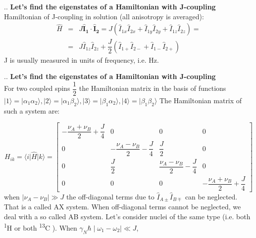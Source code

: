 \documentclass[handout]{beamer}
\begin{document}
\begin{frame}{\thesection.\thesubsection. \insertsubsection}
	\textbf{Let's find the eigenstates  of a Hamiltonian with J-coupling} \\
			Hamiltonian of J-coupling in solution (all anisotropy is averaged):
			\begin{equation}
			\begin{array}{lcl}
			\hat{H}  &=& J \bm{\hat{I}_{1}} \cdot  \bm{\hat{I}_{2}} = J ( \hat{I}_{1x} \hat{I}_{2x} + \hat{I}_{1y} \hat{I}_{2y} + \hat{I}_{1z} \hat{I}_{2z}   ) =	\\
			&=&  J  \hat{I}_{1z} \hat{I}_{2z} +\dfrac{J}{2} (\hat{I}_{1+} \hat{I}_{2-} + \hat{I}_{1-} \hat{I}_{2+} )  	  
			\end{array}
			\end{equation}
			J is usually measured in units of frequency, i.e. Hz. 
		
\end{frame}


\begin{frame}{\thesection.\thesubsection. \insertsubsection}
	\textbf{Let's find the eigenstates  of a Hamiltonian with J-coupling} \\
		For two coupled spins $\dfrac{1}{2}$ the Hamiltonian matrix in the basis of functions $\vert 1 \rangle =  \vert \alpha_1 \alpha_2 \rangle, \vert 2 \rangle =  \vert \alpha_1 \beta_2 \rangle, \vert 3 \rangle =  \vert \beta_1 \alpha_2 \rangle, \vert 4 \rangle =  \vert \beta_1 \beta_2 \rangle$
		The Hamiltonian matrix of such a system are:
		
		{\tiny
			\begin{equation}
			H_{ik}= \langle i \vert \hat{H} \vert k \rangle = 
			\begin{bmatrix}
			-\dfrac{\nu_A+ \nu_{B}  }{2} + \dfrac{J}{4}   & 0 & 0 & 0 \\
			0 & -\dfrac{\nu_A-\nu_B}{2} - \dfrac{J}{4}  & \dfrac{J}{2} & 0 \\
			0 & \dfrac{J}{2} & \dfrac{\nu_A-\nu_B}{2} - \dfrac{J}{4}  & 0 \\
			0 & 0 & 0 & -\dfrac{\nu_A+\nu_B}{2} + \dfrac{J}{4}                  
			\end{bmatrix}
			\end{equation}
		}%
		when $\mid \nu_A -\nu_B \mid \gg J $ the off-diagonal terms due to $\hat{I}_{A\pm} \hat{I}_{B\mp}$ can be neglected. That is a called \alert{AX system}. When off-diagonal terms cannot be neglected, we deal with a so called \alert{AB system}.
		Let's consider nuclei of the same type (i.e. both \textsuperscript{1}H or both \textsuperscript{13}C ). When $\gamma_N \hbar \mid \omega_1 -\omega_2 \mid \ll J $,
\end{frame}
\end{document}
